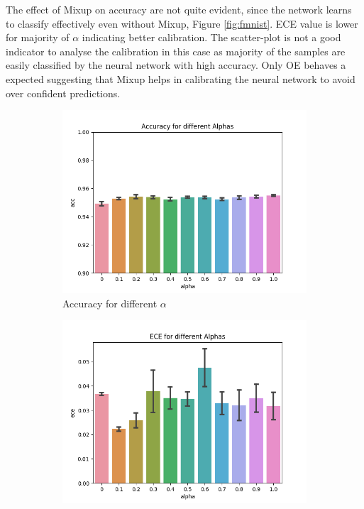 \documentclass{article}
\begin{document}
The effect of Mixup on accuracy are not quite evident, since the network learns to classify effectively even without Mixup, Figure \ref{fig:fmnist}. ECE value is lower for majority of $\alpha$ indicating better calibration. The scatter-plot is not a good indicator to analyse the calibration in this case as majority of the samples are easily classified by the neural network with high accuracy. Only OE behaves a expected suggesting that Mixup helps in calibrating the neural network to avoid over confident predictions.    
\begin{figure}[h]
     \centering
     \begin{subfigure}[b]{0.31\textwidth}
         \centering
         \includegraphics[width=\textwidth]{images/fmnist/accuracyValpha.png}
         \caption{Accuracy for different $\alpha$}
     \end{subfigure}
     \begin{subfigure}[b]{0.31\textwidth}
         \centering
         \includegraphics[width=\textwidth]{images/fmnist/eceValpha.png}

\end{subfigure}
\end{figure}
\end{document}
